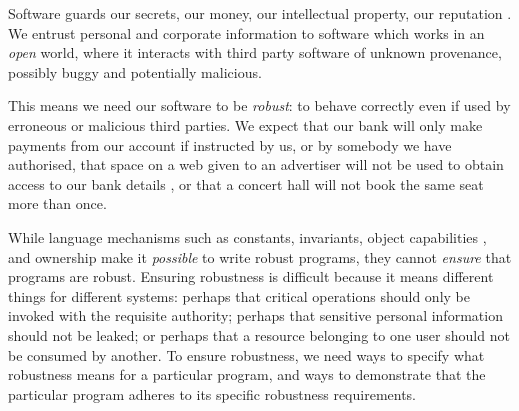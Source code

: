 Software guards our secrets, our money, our intellectual property,
our reputation \cite{covern}.  We entrust personal and
corporate information to software which works in an \emph{open} world, 
where  it interacts with 
third party software of unknown provenance, possibly buggy and potentially malicious.

This means we need our software to be \emph{robust}:
to behave correctly even if  used 
by erroneous or malicious third parties.
We expect that our bank will only make payments 
from our account if instructed by us, or by somebody we have authorised, 
that space on a web given to an advertiser will not be used
to obtain access to our bank details \cite{cwe}, or that a
concert hall will not book the same seat more than once.



While language mechanisms such as constants, invariants, 
object capabilities \cite{MillerPhD}, and 
ownership \cite{ownalias} 
make it \textit{possible} to write robust
programs, they cannot \textit{ensure} that programs are robust.
Ensuring robustness is difficult because it means 
different things for different systems: perhaps
that critical operations should only be invoked with the requisite authority;
perhaps that sensitive personal information should not be leaked; 
or perhaps that a resource belonging to one user should not be consumed by another.
%
To ensure robustness, we need ways to specify what robustness means for a 
particular program, and ways to demonstrate that the particular program 
adheres to its specific robustness requirements.



